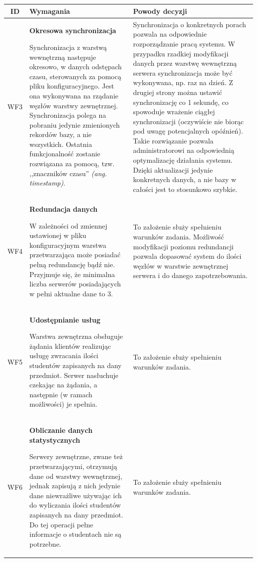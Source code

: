 \begin{tabularx}{\textwidth}{|c|X|X|}
\hline
\textbf{ID} & \textbf{Wymagania}  & \textbf{Powody decyzji} \\
\hline

\label{z:WF3} WF3 & \textbf{Okresowa synchronizacja}

 Synchronizacja z warstwą wewnętrzną następuje okresowo, w danych odstępach czasu, sterowanych za pomocą pliku konfiguracyjnego. Jest ona wykonywana na rządanie węzłów warstwy zewnętrznej. Synchronizacja polega na pobraniu jedynie zmienionych rekordów bazy, a nie wszystkich. Ostatnia funkcjonalność zostanie rozwiązana za pomocą, tzw. ,,znaczników czasu'' \textit{(ang. timestamp)}. & Synchronizacja o konkretnych porach pozwala na odpowiednie rozporządzanie pracą systemu. W przypadku rzadkiej modyfikacji danych przez warstwę wewnętrzną serwera synchronizacja może być wykonywana, np. raz na dzień. Z drugiej strony można ustawić synchronizację co 1 sekundę, co spowoduje wrażenie ciągłej synchronizacji (oczywiście nie biorąc pod uwagę potencjalnych opóźnień). Takie rozwiązanie pozwala administratorowi na odpowiednią optymalizację działania systemu. Dzięki aktualizacji jedynie konkretnych danych, a nie bazy w całości jest to stosunkowo szybkie. \\
\hline

\label{z:WF4} WF4 & \textbf{Redundacja danych }

W zależności od zmiennej ustawionej w pliku konfiguracyjnym warstwa przetwarzająca może posiadać pełną redundancję bądź nie. Przyjmuje się, że minimalna liczba serwerów posiadających w pełni aktualne dane to 3. & To założenie służy spełnieniu warunków zadania. Możliwość modyfikacji poziomu redundancji pozwala dopasować system do ilości węzłów w warstwie zewnętrznej serwera i do danego zapotrzebowania.\\
\hline

\label{z:WF5} WF5 & \textbf{Udostępnianie usług }

 Warstwa zewnętrzna obsługuje żądania klientów realizując usługę zwracania ilości studentów zapisanych na dany przedmiot. Serwer nasłuchuje czekając na żądania, a następnie (w ramach możliwości) je spełnia. & To założenie służy spełnieniu warunków zadania. \\
\hline



\label{z:WF6} WF6 & \textbf{Obliczanie danych statystycznych }

  Serwery zewnętrzne, zwane też przetwarzającymi, otrzymują dane od warstwy wewnętrznej, jednak zapisują z nich jedynie dane niewrażliwe używając ich do wyliczania ilości studentów zapisanych na dany przedmiot. Do tej operacji pełne informacje o studentach nie są potrzebne. & 
To założenie służy spełnieniu warunków zadania. \\
\hline

\end{tabularx}
